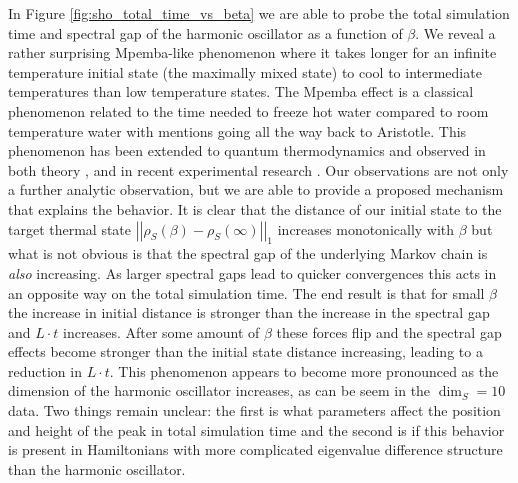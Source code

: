 \documentclass[
 amsmath,amssymb,
 aps,
onecolumn, 
nofootinbib]{revtex4-2}
\newcommand{\norm}[1]{\left|\left| #1 \right|\right|}
\begin{document}
In Figure \ref{fig:sho_total_time_vs_beta} we are able to probe the total simulation time and spectral gap of the harmonic oscillator as a function of $\beta$. We reveal a rather surprising Mpemba-like phenomenon where it takes longer for an infinite temperature initial state (the maximally mixed state) to cool to intermediate temperatures than low temperature states. The Mpemba effect \cite{mpemba} is a classical phenomenon related to the time needed to freeze hot water compared to room temperature water with mentions going all the way back to Aristotle. This phenomenon has been extended to quantum thermodynamics and observed in both theory \cite{nickMpemba}, \cite{mpembaExplanation} and in recent experimental research \cite{zhang2025mpembaObservation}. Our observations are not only a further analytic observation, but we are able to provide a proposed mechanism that explains the behavior. It is clear that the distance of our initial state to the target thermal state $\norm{\rho_S(\beta) - \rho_S(\infty)}_1$ increases monotonically with $\beta$ but what is not obvious is that the spectral gap of the underlying Markov chain is \emph{also} increasing. As larger spectral gaps lead to quicker convergences this acts in an opposite way on the total simulation time. The end result is that for small $\beta$ the increase in initial distance is stronger than the increase in the spectral gap and $L \cdot t$ increases. After some amount of $\beta$ these forces flip and the spectral gap effects become stronger than the initial state distance increasing, leading to a reduction in $L \cdot t$. This phenomenon appears to become more pronounced as the dimension of the harmonic oscillator increases, as can be seem in the $\dim_S = 10$ data. Two things remain unclear: the first is what parameters affect the position and height of the peak in total simulation time and the second is if this behavior is present in Hamiltonians with more complicated eigenvalue difference structure than the harmonic oscillator.
\end{document}
